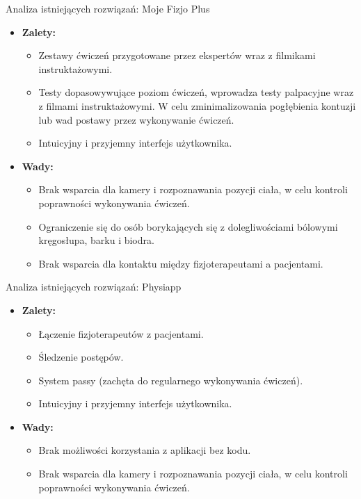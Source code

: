 \documentclass{beamer}
\begin{document}
\begin{frame}{Analiza istniejących rozwiązań: Moje Fizjo Plus}
    \begin{itemize}
        \item \textbf{Zalety:}
        \begin{itemize}
            \item Zestawy ćwiczeń przygotowane przez ekspertów wraz z filmikami instruktażowymi.
            \item Testy dopasowywujące poziom ćwiczeń, wprowadza testy palpacyjne wraz z filmami instruktażowymi. W celu zminimalizowania pogłębienia kontuzji lub wad postawy przez wykonywanie ćwiczeń.
            \item Intuicyjny i przyjemny interfejs użytkownika.
        \end{itemize}
        \item \textbf{Wady:}
        \begin{itemize}
            \item Brak wsparcia dla kamery i rozpoznawania pozycji ciała, w celu kontroli poprawności wykonywania ćwiczeń.
            \item Ograniczenie się do osób borykających się z dolegliwościami bólowymi kręgosłupa, barku i biodra.
            \item Brak wsparcia dla kontaktu między fizjoterapeutami a pacjentami.
        \end{itemize}
    \end{itemize}
\end{frame}

\begin{frame}{Analiza istniejących rozwiązań: Physiapp}
    \begin{itemize}
        \item \textbf{Zalety:}
        \begin{itemize}
            \item Łączenie fizjoterapeutów z pacjentami.
            \item Śledzenie postępów.
            \item System passy (zachęta do regularnego wykonywania ćwiczeń).
            \item Intuicyjny i przyjemny interfejs użytkownika.
        \end{itemize}
        \item \textbf{Wady:}
        \begin{itemize}
            \item Brak możliwości korzystania z aplikacji bez kodu.
            \item Brak wsparcia dla kamery i rozpoznawania pozycji ciała, w celu kontroli poprawności wykonywania ćwiczeń.
        \end{itemize}
    \end{itemize}
\end{frame}
\end{document}
